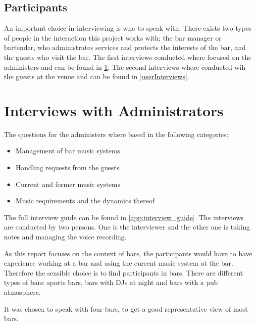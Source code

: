 \subsection{Participants}
An important choice in interviewing is who to speak with. There exists two types of people in the interaction this project works with; the bar manager or bartender, who administrates services and protects the interests of the bar, and the guests who visit the bar. The first interviews conducted where focused on the administers and can be found in \cref{sub:administersinterviews}. The second interviews where conducted wih the guests at the venue and can be found in \cref{userInterviews}.

\section{Interviews with Administrators}
\label{sub:administersinterviews}
The questions for the administers where based in the following categories:

\begin{itemize}
  \item Management of bar music systems
  \item Handling requests from the guests
  \item Current and former music systems
  \item Music requirements and the dynamics thereof
\end{itemize}

The full interview guide can be found in \cref{app:interview_guide}. The interviews are conducted by two persons. One is the interviewer and the other one is taking notes and managing the voice recording.

As this report focuses on the context of bars, the participants would have to have experience working at a bar and using the current music system at the bar. Therefore the sensible choice is to find participants in bars. There are different types of bars: sports bars, bars with DJs at night and bars with a pub atmosphere.

It was chosen to speak with four bars, to get a good representative view of most bars.


